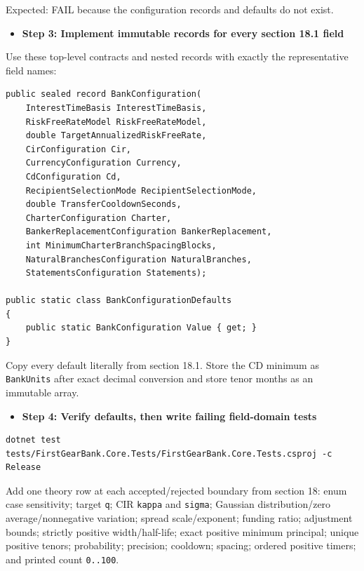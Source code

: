 \documentclass[
  10pt,
  letterpaper,
]{article}
\newcommand{\passthrough}[1]{#1}
\providecommand{\tightlist}{%
  \setlength{\itemsep}{0pt}\setlength{\parskip}{0pt}}
\begin{document}
Expected: FAIL because the configuration records and defaults do not
exist.

\begin{itemize}
\tightlist
\item[$\square$]
  \textbf{Step 3: Implement immutable records for every section 18.1
  field}
\end{itemize}

Use these top-level contracts and nested records with exactly the
representative field names:

\begin{lstlisting}
public sealed record BankConfiguration(
    InterestTimeBasis InterestTimeBasis,
    RiskFreeRateModel RiskFreeRateModel,
    double TargetAnnualizedRiskFreeRate,
    CirConfiguration Cir,
    CurrencyConfiguration Currency,
    CdConfiguration Cd,
    RecipientSelectionMode RecipientSelectionMode,
    double TransferCooldownSeconds,
    CharterConfiguration Charter,
    BankerReplacementConfiguration BankerReplacement,
    int MinimumCharterBranchSpacingBlocks,
    NaturalBranchesConfiguration NaturalBranches,
    StatementsConfiguration Statements);

public static class BankConfigurationDefaults
{
    public static BankConfiguration Value { get; }
}
\end{lstlisting}

Copy every default literally from section 18.1. Store the CD minimum as
\passthrough{\lstinline!BankUnits!} after exact decimal conversion and
store tenor months as an immutable array.

\begin{itemize}
\tightlist
\item[$\square$]
  \textbf{Step 4: Verify defaults, then write failing field-domain
  tests}
\end{itemize}

\begin{lstlisting}
dotnet test tests/FirstGearBank.Core.Tests/FirstGearBank.Core.Tests.csproj -c Release
\end{lstlisting}

Add one theory row at each accepted/rejected boundary from section 18:
enum case sensitivity; target \passthrough{\lstinline!q!}; CIR
\passthrough{\lstinline!kappa!} and \passthrough{\lstinline!sigma!};
Gaussian distribution/zero average/nonnegative variation; spread
scale/exponent; funding ratio; adjustment bounds; strictly positive
width/half-life; exact positive minimum principal; unique positive
tenors; probability; precision; cooldown; spacing; ordered positive
timers; and printed count \passthrough{\lstinline!0..100!}.
\end{document}
